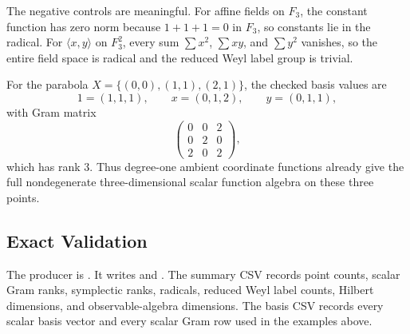 The negative controls are meaningful.  For affine fields on \(F_3\), the
constant function has zero norm because \(1+1+1=0\) in \(F_3\), so constants
lie in the radical.  For \(\langle x,y\rangle\) on \(F_3^2\), every sum
\(\sum x^2\), \(\sum xy\), and \(\sum y^2\) vanishes, so the entire field
space is radical and the reduced Weyl label group is trivial.

For the parabola \(X=\{(0,0),(1,1),(2,1)\}\), the checked basis values are
\[
  1=(1,1,1),\qquad x=(0,1,2),\qquad y=(0,1,1),
\]
with Gram matrix
\[
  \begin{pmatrix}
  0&0&2\\
  0&2&0\\
  2&0&2
  \end{pmatrix},
\]
which has rank \(3\).  Thus degree-one ambient coordinate functions already
give the full nondegenerate three-dimensional scalar function algebra on these
three points.

\subsection{Exact Validation}

The producer is .  It writes
and
.
The summary CSV records point counts, scalar Gram ranks, symplectic ranks,
radicals, reduced Weyl label counts, Hilbert dimensions, and observable-algebra
dimensions.  The basis CSV records every scalar basis vector and every scalar
Gram row used in the examples above.
